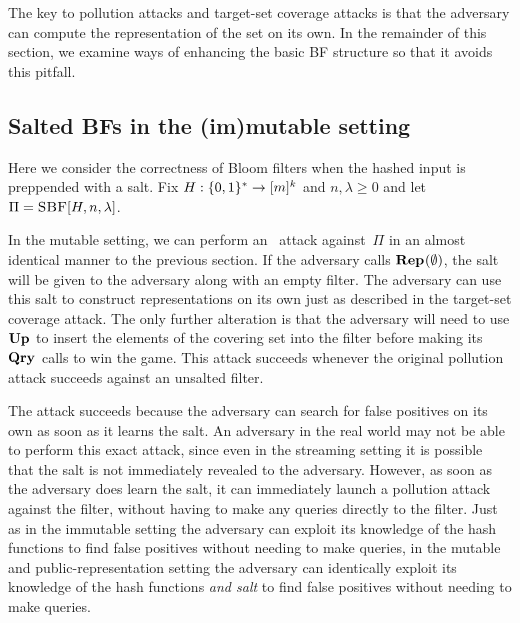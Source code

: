 
The key to pollution attacks and target-set coverage attacks is that the
adversary can compute the representation of the set on its own. In the remainder
of this section, we examine ways of enhancing the basic BF structure so that it
avoids this pitfall.

\subsection{Salted BFs in the (im)mutable setting}
%
Here we consider the correctness of Bloom filters when the hashed input is
preppended with a salt.
%
Fix $H:\{0,1\}^*\to[m]^k$ and $n,\lambda\geq0$ and let
$\Pi = \textnormal{\textsc{SBF}}[H,n,\lambda]$.


In the mutable setting, we can perform an \errep\ attack against~$\Pi$ in an
almost identical manner to the previous section. If the adversary calls
$\textup{\textbf{Rep}}\hspace{0.5pt}(\emptyset)$, the salt will be given to the adversary along with an empty
filter. The adversary can use this salt to construct representations on its own
just as described in the target-set coverage attack. The only further alteration
is that the adversary will need to use $\textup{\textbf{Up}}\hspace{0.5pt}$ to insert the elements of the
covering set into the filter before making its $\textup{\textbf{Qry}}\hspace{0.5pt}$ calls to win the game.
This attack succeeds whenever the original pollution attack succeeds against an
unsalted filter.

The attack succeeds because the adversary can search for false positives on its
own as soon as it learns the salt. An adversary in the real world may not be
able to perform this exact attack, since even in the streaming setting it is
possible that the salt is not immediately revealed to the adversary. However, as
soon as the adversary does learn the salt, it can immediately launch a pollution
attack against the filter, without having to make any queries directly to the
filter. Just as in the immutable setting the adversary can exploit its knowledge
of the hash functions to find false positives without needing to make queries,
in the mutable and public-representation setting the adversary can identically
exploit its knowledge of the hash functions \textit{and salt} to find false
positives without needing to make queries.

